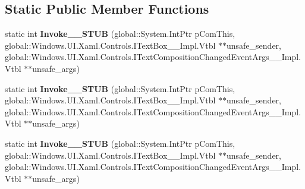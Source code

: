 \subsection*{Static Public Member Functions}
\begin{DoxyCompactItemize}
\item 
\mbox{\label{struct_windows_1_1_foundation_1_1_typed_event_handler___a___windows___u_i___xaml___controls___te0b038d62b9928b8ea6f0314c4279430d_acd364c41f24b7e657cbc2aba08afcb51}} 
static int {\bfseries Invoke\+\_\+\+\_\+\+S\+T\+UB} (global\+::\+System.\+Int\+Ptr p\+Com\+This, global\+::\+Windows.\+U\+I.\+Xaml.\+Controls.\+I\+Text\+Box\+\_\+\+\_\+\+Impl.\+Vtbl $\ast$$\ast$unsafe\+\_\+sender, global\+::\+Windows.\+U\+I.\+Xaml.\+Controls.\+I\+Text\+Composition\+Changed\+Event\+Args\+\_\+\+\_\+\+Impl.\+Vtbl $\ast$$\ast$unsafe\+\_\+args)
\item 
\mbox{\label{struct_windows_1_1_foundation_1_1_typed_event_handler___a___windows___u_i___xaml___controls___te0b038d62b9928b8ea6f0314c4279430d_acd364c41f24b7e657cbc2aba08afcb51}} 
static int {\bfseries Invoke\+\_\+\+\_\+\+S\+T\+UB} (global\+::\+System.\+Int\+Ptr p\+Com\+This, global\+::\+Windows.\+U\+I.\+Xaml.\+Controls.\+I\+Text\+Box\+\_\+\+\_\+\+Impl.\+Vtbl $\ast$$\ast$unsafe\+\_\+sender, global\+::\+Windows.\+U\+I.\+Xaml.\+Controls.\+I\+Text\+Composition\+Changed\+Event\+Args\+\_\+\+\_\+\+Impl.\+Vtbl $\ast$$\ast$unsafe\+\_\+args)
\item 
\mbox{\label{struct_windows_1_1_foundation_1_1_typed_event_handler___a___windows___u_i___xaml___controls___te0b038d62b9928b8ea6f0314c4279430d_acd364c41f24b7e657cbc2aba08afcb51}} 
static int {\bfseries Invoke\+\_\+\+\_\+\+S\+T\+UB} (global\+::\+System.\+Int\+Ptr p\+Com\+This, global\+::\+Windows.\+U\+I.\+Xaml.\+Controls.\+I\+Text\+Box\+\_\+\+\_\+\+Impl.\+Vtbl $\ast$$\ast$unsafe\+\_\+sender, global\+::\+Windows.\+U\+I.\+Xaml.\+Controls.\+I\+Text\+Composition\+Changed\+Event\+Args\+\_\+\+\_\+\+Impl.\+Vtbl $\ast$$\ast$unsafe\+\_\+args)
\item 

\end{DoxyCompactItemize}
